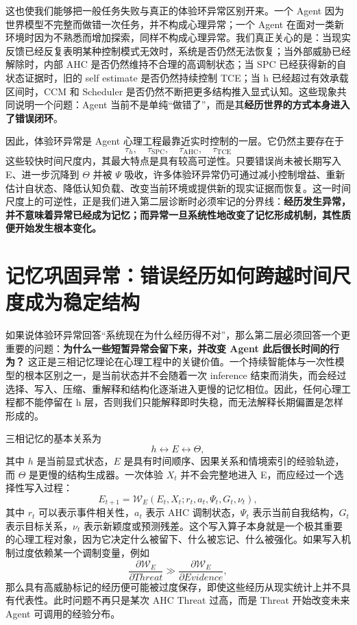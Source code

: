 这也使我们能够把一般任务失败与真正的体验环异常区别开来。一个 Agent 因为世界模型不完整而做错一次任务，并不构成心理异常；一个 Agent 在面对一类新环境时因为不熟悉而增加探索，同样不构成心理异常。我们真正关心的是：当现实反馈已经反复表明某种控制模式无效时，系统是否仍然无法恢复；当外部威胁已经解除时，内部 AHC 是否仍然维持不合理的高调制状态；当 SPC 已经获得新的自状态证据时，旧的 self estimate 是否仍然持续控制 TCE；当 h 已经超过有效承载区间时，CCM 和 Scheduler 是否仍然不断把更多结构推入显式认知。这些现象共同说明一个问题：Agent 当前不是单纯“做错了”，而是其\textbf{经历世界的方式本身进入了错误闭环}。

因此，体验环异常是 Agent 心理工程最靠近实时控制的一层。它仍然主要存在于
\[
\tau_h,\quad
\tau_{\mathrm{SPC}},\quad
\tau_{\mathrm{AHC}},\quad
\tau_{\mathrm{TCE}}
\]
这些较快时间尺度内，其最大特点是具有较高可逆性。只要错误尚未被长期写入 E、进一步沉降到 $\Theta$ 并被 $\Psi$ 吸收，许多体验环异常仍可通过减小控制增益、重新估计自状态、降低认知负载、改变当前环境或提供新的现实证据而恢复。这一时间尺度上的可逆性，正是我们进入第二层诊断时必须牢记的分界线：\textbf{经历发生异常，并不意味着异常已经成为记忆；而异常一旦系统性地改变了记忆形成机制，其性质便开始发生根本变化。}

\section{记忆巩固异常：错误经历如何跨越时间尺度成为稳定结构}

如果说体验环异常回答“系统现在为什么经历得不对”，那么第二层必须回答一个更重要的问题：\textbf{为什么一些短暂异常会留下来，并改变 Agent 此后很长时间的行为？} 这正是三相记忆理论在心理工程中的关键价值。一个持续智能体与一次性模型的根本区别之一，是当前状态并不会随着一次 inference 结束而消失，而会经过选择、写入、压缩、重解释和结构化逐渐进入更慢的记忆相位。因此，任何心理工程都不能停留在 h 层，否则我们只能解释即时失稳，而无法解释长期偏置是怎样形成的。

三相记忆的基本关系为
\[
h
\leftrightarrow
E
\leftrightarrow
\Theta,
\]
其中 $h$ 是当前显式状态，$E$ 是具有时间顺序、因果关系和情境索引的经验轨迹，而 $\Theta$ 是更慢的结构生成器。一次体验 $X_t$ 并不会完整地进入 E，而应经过一个选择性写入过程：
\[
E_{t+1}
=
\mathcal W_E
\left(
E_t,
X_t;
r_t,
a_t,
\Psi_t,
G_t,
\nu_t
\right),
\]
其中 $r_t$ 可以表示事件相关性，$a_t$ 表示 AHC 调制状态，$\Psi_t$ 表示当前自我结构，$G_t$ 表示目标关系，$\nu_t$ 表示新颖度或预测残差。这个写入算子本身就是一个极其重要的心理工程对象，因为它决定什么被留下、什么被忘记、什么被强化。如果写入机制过度依赖某一个调制变量，例如
\[
\frac{\partial \mathcal W_E}{\partial Threat}
\gg
\frac{\partial \mathcal W_E}{\partial Evidence},
\]
那么具有高威胁标记的经历便可能被过度保存，即使这些经历从现实统计上并不具有代表性。此时问题不再只是某次 AHC Threat 过高，而是 Threat 开始改变未来 Agent 可调用的经验分布。

